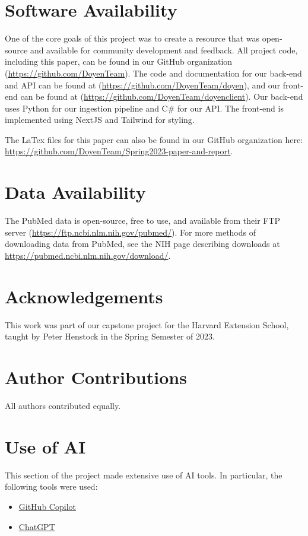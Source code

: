 \section{Software Availability}

One of the core goals of this project was to create a resource that was open-source and available for community development and feedback. All project code, including this paper, can be found in our GitHub organization (\url{https://github.com/DoyenTeam}). The code and documentation for our back-end and API can be found at (\url{https://github.com/DoyenTeam/doyen}), and our front-end can be found at (\url{https://github.com/DoyenTeam/doyenclient}). Our back-end uses Python for our ingestion pipeline and C\# for our API. The front-end is implemented using NextJS and Tailwind for styling.

The LaTex files for this paper can also be found in our GitHub organization here: \url{https://github.com/DoyenTeam/Spring2023-paper-and-report}.

\section{Data Availability}

The PubMed data is open-source, free to use, and available from their FTP server (\url{https://ftp.ncbi.nlm.nih.gov/pubmed/}). For more methods of downloading data from PubMed, see the NIH page describing downloads at \url{https://pubmed.ncbi.nlm.nih.gov/download/}.

\section{Acknowledgements}

This work was part of our capstone project for the Harvard Extension School, taught by Peter Henstock in the Spring Semester of 2023. 

\section{Author Contributions}

All authors contributed equally.

\section{Use of AI}

This section of the project made extensive use of AI tools. In particular, the following tools were used:
\begin{itemize}
    \item \href{https://copilot.github.com/}{GitHub Copilot}
    \item \href{https://chat.openai.com/}{ChatGPT}
\end{itemize}

